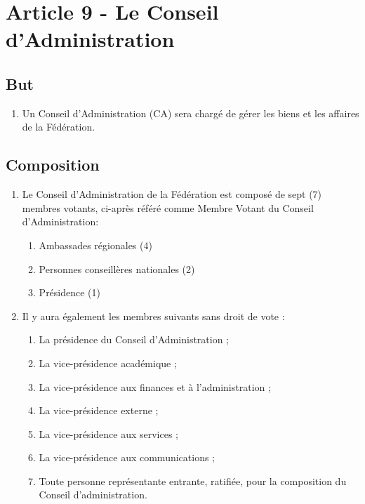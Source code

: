 \section{Article 9 - Le Conseil d'Administration}
\label{article-9-le-conseil-d-administration}

\subsection{But}
\label{but-3}

\begin{enumerate}
 \item
  Un Conseil d'Administration (CA) sera chargé de gérer les biens et les affaires de la Fédération.
\end{enumerate}

\subsection{Composition}
\label{composition-3}

\begin{enumerate}
 \item
  Le Conseil d'Administration de la Fédération est composé de sept (7) membres votants, ci-après référé comme Membre Votant du Conseil d’Administration:

  \begin{enumerate}
   \item
    Ambassades régionales (4)
   \item
    Personnes conseillères nationales (2)
   \item
    Présidence (1)

  \end{enumerate}
 \item
  Il y aura également les membres suivants sans droit de vote :

  \begin{enumerate}
   \item
    La présidence du Conseil d'Administration ;
   \item
    La vice-présidence académique ;
   \item
    La vice-présidence aux finances et à l’administration ;
   \item
    La vice-présidence externe ;
   \item
    La vice-présidence aux services ;
   \item
    La vice-présidence aux communications ;
   \item
    Toute personne représentante entrante, ratifiée, pour la composition du Conseil d'administration.
  \end{enumerate}
\end{enumerate}
